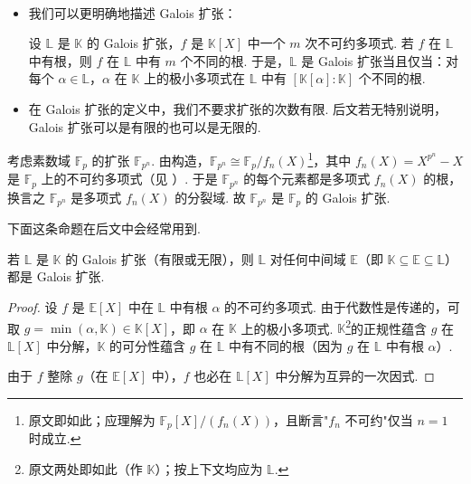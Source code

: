 \begin{remark}\label{c2-rem-1-16}
\
\begin{itemize}
    \item 我们可以更明确地描述 Galois 扩张：

设 $\mathbb{L}$ 是 $\mathbb{K}$ 的 Galois 扩张，$f$ 是 $\mathbb{K}[X]$ 中一个 $m$ 次不可约多项式. 若 $f$ 在 $\mathbb{L}$ 中有根，则 $f$ 在 $\mathbb{L}$ 中有 $m$ 个不同的根. 于是，$\mathbb{L}$ 是 Galois 扩张当且仅当：对每个 $\alpha\in\mathbb{L}$，$\alpha$ 在 $\mathbb{K}$ 上的极小多项式在 $\mathbb{L}$ 中有 $[\mathbb{K}[\alpha]:\mathbb{K}]$ 个不同的根.
    \item 在 Galois 扩张的定义中，我们不要求扩张的次数有限. 后文若无特别说明，Galois 扩张可以是有限的也可以是无限的.
\end{itemize}
\end{remark}

\begin{example}\label{c2-ex-1-17}
考虑素数域 $\mathbb{F}_p$ 的扩张 $\mathbb{F}_{p^{n}}$. 由构造，$\mathbb{F}_{p^{n}}\cong\mathbb{F}_p/f_n(X)$\footnote{原文即如此；应理解为 $\mathbb{F}_p[X]/(f_n(X))$，且断言"$f_n$ 不可约"仅当 $n=1$ 时成立.}，其中 $f_n(X)=X^{p^{n}}-X$ 是 $\mathbb{F}_p$ 上的不可约多项式（见 \cite[Theorem~5.1, \S5, Chapter~V]{lang02a}）. 于是 $\mathbb{F}_{p^{n}}$ 的每个元素都是多项式 $f_n(X)$ 的根，换言之 $\mathbb{F}_{p^{n}}$ 是多项式 $f_n(X)$ 的分裂域. 故 $\mathbb{F}_{p^{n}}$ 是 $\mathbb{F}_p$ 的 Galois 扩张.
\end{example}

下面这条命题在后文中会经常用到.

\begin{proposition}\label{c2-prop-1-4}
若 $\mathbb{L}$ 是 $\mathbb{K}$ 的 Galois 扩张（有限或无限），则 $\mathbb{L}$ 对任何中间域 $\mathbb{E}$（即 $\mathbb{K}\subseteq\mathbb{E}\subseteq\mathbb{L}$）都是 Galois 扩张.
\end{proposition}

\begin{proof}
设 $f$ 是 $\mathbb{E}[X]$ 中在 $\mathbb{L}$ 中有根 $\alpha$ 的不可约多项式. 由于代数性是传递的，可取 $g=\min(\alpha,\mathbb{K})\in\mathbb{K}[X]$，即 $\alpha$ 在 $\mathbb{K}$ 上的极小多项式. $\mathbb{K}$\footnote{原文两处即如此（作 $\mathbb{K}$）；按上下文均应为 $\mathbb{L}$.}的正规性蕴含 $g$ 在 $\mathbb{L}[X]$ 中分解，$\mathbb{K}$ 的可分性蕴含 $g$ 在 $\mathbb{L}$ 中有不同的根（因为 $g$ 在 $\mathbb{L}$ 中有根 $\alpha$）.

由于 $f$ 整除 $g$（在 $\mathbb{E}[X]$ 中），$f$ 也必在 $\mathbb{L}[X]$ 中分解为互异的一次因式.
\end{proof}

